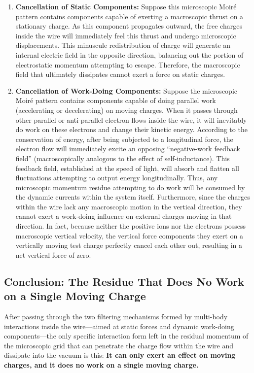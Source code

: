 \documentclass[12pt, a4paper]{article}
\begin{document}
\begin{enumerate}
    \item \textbf{Cancellation of Static Components:} Suppose this microscopic Moiré pattern contains components capable of exerting a macroscopic thrust on a stationary charge. As this component propagates outward, the free charges inside the wire will immediately feel this thrust and undergo microscopic displacements. This minuscule redistribution of charge will generate an internal electric field in the opposite direction, balancing out the portion of electrostatic momentum attempting to escape. Therefore, the macroscopic field that ultimately dissipates cannot exert a force on static charges.
    
    \item \textbf{Cancellation of Work-Doing Components:} Suppose the microscopic Moiré pattern contains components capable of doing parallel work (accelerating or decelerating) on moving charges. When it passes through other parallel or anti-parallel electron flows inside the wire, it will inevitably do work on these electrons and change their kinetic energy. According to the conservation of energy, after being subjected to a longitudinal force, the electron flow will immediately excite an opposing ``negative-work feedback field'' (macroscopically analogous to the effect of self-inductance). This feedback field, established at the speed of light, will absorb and flatten all fluctuations attempting to output energy longitudinally. Thus, any microscopic momentum residue attempting to do work will be consumed by the dynamic currents within the system itself. Furthermore, since the charges within the wire lack any macroscopic motion in the vertical direction, they cannot exert a work-doing influence on external charges moving in that direction.  In fact, because neither the positive ions nor the electrons possess macroscopic vertical velocity, the vertical force components they exert on a vertically moving test charge perfectly cancel each other out, resulting in a net vertical force of zero.
\end{enumerate}

\subsection{Conclusion: The Residue That Does No Work on a Single Moving Charge}

After passing through the two filtering mechanisms formed by multi-body interactions inside the wire---aimed at static forces and dynamic work-doing components---the only specific interaction form left in the residual momentum of the microscopic grid that can penetrate the charge flow within the wire and dissipate into the vacuum is this: \textbf{It can only exert an effect on moving charges, and it does no work on a single moving charge.}
\end{document}
